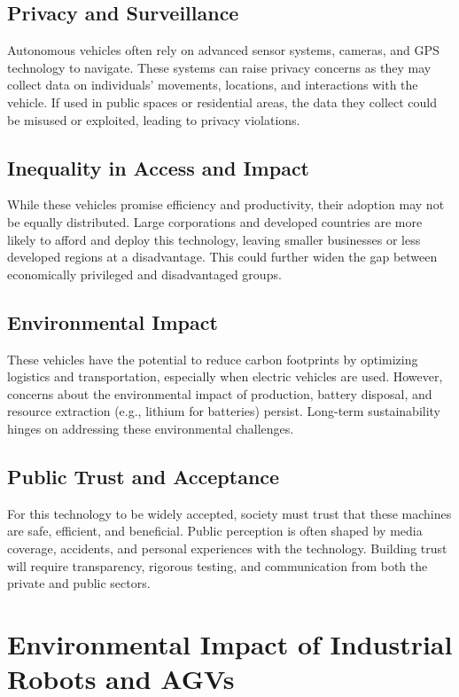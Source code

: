 \documentclass[../../main]{subfiles}
\begin{document}
\subsection{Privacy and Surveillance}

Autonomous vehicles often rely on advanced sensor systems, cameras, and GPS technology to navigate. These systems 
can raise privacy concerns as they may collect data on individuals' movements, locations, and interactions 
with the vehicle. If used in public spaces or residential areas, the data they collect could be misused 
or exploited, leading to privacy violations.

\subsection{Inequality in Access and Impact}

While these vehicles promise efficiency and productivity, their adoption may not be equally distributed. Large 
corporations and developed countries are more likely to afford and deploy this technology, leaving smaller businesses 
or less developed regions at a disadvantage. This could further widen the gap between economically privileged 
and disadvantaged groups.


\subsection{Environmental Impact}

These vehicles have the potential to reduce carbon footprints by optimizing logistics and transportation, 
especially when electric vehicles are used. However, concerns about the environmental impact of 
production, battery disposal, and resource extraction (e.g., lithium for batteries) persist. 
Long-term sustainability hinges on addressing these environmental challenges.

\subsection{Public Trust and Acceptance}

For this technology to be widely accepted, society must trust that these machines are safe, efficient, 
and beneficial. Public perception is often shaped by media coverage, accidents, and personal 
experiences with the technology. Building trust will require transparency, rigorous testing, 
and communication from both the private and public sectors.

\section{Environmental Impact of Industrial Robots and AGVs}
\end{document}
